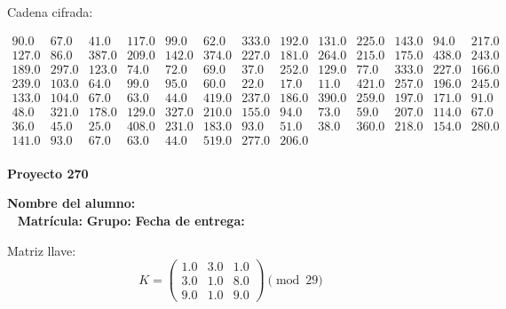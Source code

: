 \documentclass[12pt]{article}
\begin{document}
Cadena cifrada:
\begin{center}
$\begin{array}{lllllllllllll}
90.0 & 67.0 & 41.0 & 117.0 & 99.0 & 62.0 & 333.0 & 192.0 & 131.0 & 225.0 & 143.0 & 94.0 & 217.0\\
127.0 & 86.0 & 387.0 & 209.0 & 142.0 & 374.0 & 227.0 & 181.0 & 264.0 & 215.0 & 175.0 & 438.0 & 243.0\\
189.0 & 297.0 & 123.0 & 74.0 & 72.0 & 69.0 & 37.0 & 252.0 & 129.0 & 77.0 & 333.0 & 227.0 & 166.0\\
239.0 & 103.0 & 64.0 & 99.0 & 95.0 & 60.0 & 22.0 & 17.0 & 11.0 & 421.0 & 257.0 & 196.0 & 245.0\\
133.0 & 104.0 & 67.0 & 63.0 & 44.0 & 419.0 & 237.0 & 186.0 & 390.0 & 259.0 & 197.0 & 171.0 & 91.0\\
48.0 & 321.0 & 178.0 & 129.0 & 327.0 & 210.0 & 155.0 & 94.0 & 73.0 & 59.0 & 207.0 & 114.0 & 67.0\\
36.0 & 45.0 & 25.0 & 408.0 & 231.0 & 183.0 & 93.0 & 51.0 & 38.0 & 360.0 & 218.0 & 154.0 & 280.0\\
141.0 & 93.0 & 67.0 & 63.0 & 44.0 & 519.0 & 277.0 & 206.0\\
\end{array}$
\end{center}

\newpage


\textbf{Proyecto 270}

\textbf{Nombre del alumno:} \underline{\hspace{13cm}}\\\
\vspace{1cm}
\textbf{Matrícula:} \underline{\hspace{4cm}} \hspace{1cm}
\textbf{Grupo:} \underline{\hspace{2cm}}
\textbf{Fecha de entrega:} \underline{\hspace{2cm}}

\medskip

Matriz llave:
\[
K = \begin{pmatrix}
1.0 & 3.0 & 1.0\\
3.0 & 1.0 & 8.0\\
9.0 & 1.0 & 9.0
\end{pmatrix} \pmod{29}
\]
\end{document}
